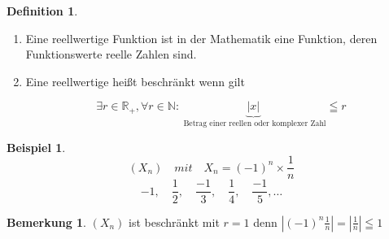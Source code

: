 \documentclass[a4paper,12pt,leqno]{report}
\theoremstyle{plain} %
\theoremstyle{definition} %
\newtheorem{remark}[theorem]{Bemerkung}
\newtheorem{definition}[theorem]{Definition}
\newtheorem{example}[theorem]{Beispiel}
\begin{document}
    \begin{definition}


        \begin{enumerate}

            \mbox{}\item Eine reellwertige Funktion ist in der Mathematik eine Funktion, deren Funktionswerte reelle Zahlen sind.

            \item Eine reellwertige heißt beschränkt wenn gilt

            \[	\exists r \in \mathbb{R}_+ , \forall r \in \mathbb{N}: \underbrace{|x|}_{\text{ Betrag einer reellen oder komplexer Zahl}} \leqq r   \]

        \end{enumerate}
    \end{definition}

    \begin{example}
        \[(X_n)\quad mit \quad X_n = (-1)^n \times \frac{1}{n} \]
        \[-1 ,\quad \frac{1}{2}, \quad \frac{-1}{3}, \quad \frac{1}{4} ,\quad \frac{-1}{5},\dots \]
    \end{example}

    \begin{remark}

        $(X_n)$ ist beschränkt mit $r = 1$ denn $|(-1)^n \frac{1}{n}|=|\frac{1}{n}| \leqq 1  $

\end{remark}
\end{document}
